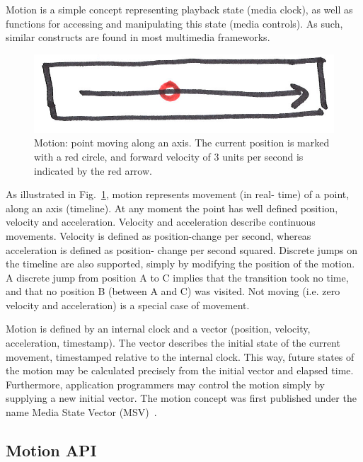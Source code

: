 Motion is a simple concept representing playback state (media clock), as well
as functions for accessing and manipulating this state (media controls). As
such, similar constructs are found in most multimedia frameworks.

\begin{figure}[h]
\centering
\includegraphics[scale=1]{fig/motion.png}
\caption{Motion: point moving along an axis. The current position
is marked with a red circle, and forward velocity of 3 units per second is
indicated by the red arrow.}
\label{fig:motion}
\end{figure}

As illustrated in Fig.~\ref{fig:motion}, motion represents movement (in real-
time) of a point, along an axis (timeline). At any moment the point has well
defined position, velocity and acceleration. Velocity and acceleration
describe continuous movements. Velocity is defined as position-change per
second, whereas acceleration is defined as position- change per second
squared. Discrete jumps on the timeline are also supported, simply by
modifying the position of the motion. A discrete jump from position A to C
implies that the transition took no time, and that no position B (between A
and C) was visited. Not moving (i.e. zero velocity and acceleration) is a
special case of movement.

\label{sec:internalstate}
Motion is defined by an internal clock and a vector (position, velocity,
acceleration, timestamp). The vector describes the initial state of the
current movement, timestamped relative to the internal clock. This way, future
states of the motion may be calculated precisely from the initial vector and
elapsed time. Furthermore, application programmers may control the motion
simply by supplying a new initial vector. The motion concept was first
published under the name Media State Vector (MSV)~\cite{msv}.


\subsection{Motion API}
\label{sec:motionapi}

